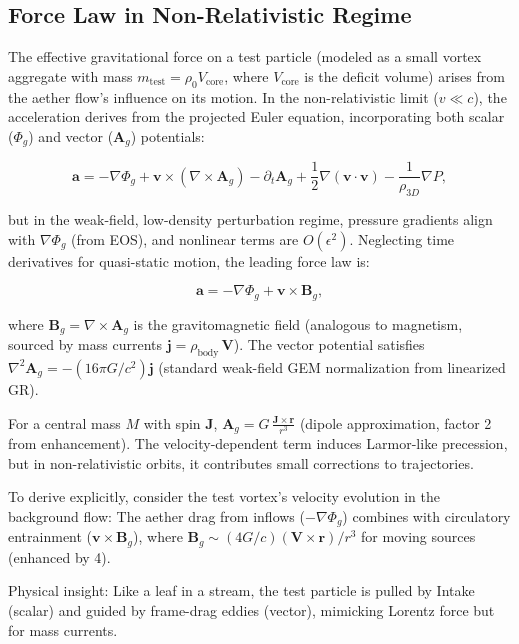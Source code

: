 \subsection{Force Law in Non-Relativistic Regime}

The effective gravitational force on a test particle (modeled as a small vortex aggregate with mass $m_{\text{test}} = \rho_0 V_{\text{core}}$, where $V_{\text{core}}$ is the deficit volume) arises from the aether flow's influence on its motion. In the non-relativistic limit ($v \ll c$), the acceleration derives from the projected Euler equation, incorporating both scalar ($\Phi_g$) and vector ($\mathbf{A}_g$) potentials:

\[
\mathbf{a} = -\nabla \Phi_g + \mathbf{v} \times (\nabla \times \mathbf{A}_g) - \partial_t \mathbf{A}_g + \frac{1}{2} \nabla (\mathbf{v} \cdot \mathbf{v}) - \frac{1}{\rho_{3D}} \nabla P,
\]

but in the weak-field, low-density perturbation regime, pressure gradients align with $\nabla \Phi_g$ (from EOS), and nonlinear terms are $O(\epsilon^2)$. Neglecting time derivatives for quasi-static motion, the leading force law is:

\[
\mathbf{a} = -\nabla \Phi_g + \mathbf{v} \times \mathbf{B}_g,
\]

where $\mathbf{B}_g = \nabla \times \mathbf{A}_g$ is the gravitomagnetic field (analogous to magnetism, sourced by mass currents $\mathbf{j} = \rho_{\text{body}} \, \mathbf{V}$). The vector potential satisfies $\nabla^2 \mathbf{A}_g = - (16\pi G / c^2) \mathbf{j}$ (standard weak-field GEM normalization from linearized GR).

For a central mass $M$ with spin $\mathbf{J}$, $\mathbf{A}_g = G \, \frac{\mathbf{J} \times \mathbf{r}}{r^3}$ (dipole approximation, factor 2 from enhancement). The velocity-dependent term induces Larmor-like precession, but in non-relativistic orbits, it contributes small corrections to trajectories.

To derive explicitly, consider the test vortex's velocity evolution in the background flow: The aether drag from inflows ($-\nabla \Phi_g$) combines with circulatory entrainment ($\mathbf{v} \times \mathbf{B}_g$), where $\mathbf{B}_g \sim (4 G / c) (\mathbf{V} \times \mathbf{r}) / r^3$ for moving sources (enhanced by 4).

Physical insight: Like a leaf in a stream, the test particle is pulled by Intake (scalar) and guided by frame-drag eddies (vector), mimicking Lorentz force but for mass currents.

